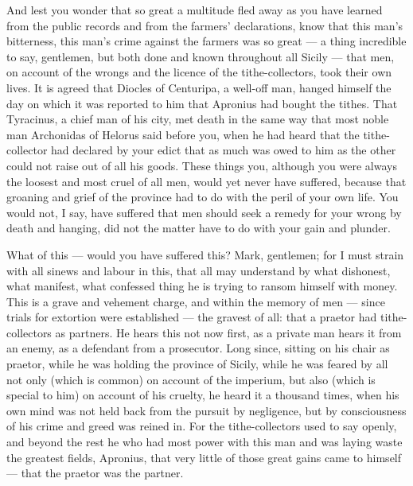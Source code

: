  And lest you wonder that so great a multitude fled away as you have learned from the public records and from the farmers' declarations, know that this man's bitterness, this man's crime against the farmers was so great --- a thing incredible to say, gentlemen, but both done and known throughout all Sicily --- that men, on account of the wrongs and the licence of the tithe-collectors, took their own lives. It is agreed that Diocles of Centuripa, a well-off man, hanged himself the day on which it was reported to him that Apronius had bought the tithes. That Tyracinus, a chief man of his city, met death in the same way that most noble man Archonidas of Helorus said before you, when he had heard that the tithe-collector had declared by your edict that as much was owed to him as the other could not raise out of all his goods. These things you, although you were always the loosest and most cruel of all men, would yet never have suffered, because that groaning and grief of the province had to do with the peril of your own life. You would not, I say, have suffered that men should seek a remedy for your wrong by death and hanging, did not the matter have to do with your gain and plunder.

 What of this --- would you have suffered this? Mark, gentlemen; for I must strain with all sinews and labour in this, that all may understand by what dishonest, what manifest, what confessed thing he is trying to ransom himself with money. This is a grave and vehement charge, and within the memory of men --- since trials for extortion were established --- the gravest of all: that a praetor had tithe-collectors as partners. He hears this not now first, as a private man hears it from an enemy, as a defendant from a prosecutor. Long since, sitting on his chair as praetor, while he was holding the province of Sicily, while he was feared by all not only (which is common) on account of the imperium, but also (which is special to him) on account of his cruelty, he heard it a thousand times, when his own mind was not held back from the pursuit by negligence, but by consciousness of his crime and greed was reined in. For the tithe-collectors used to say openly, and beyond the rest he who had most power with this man and was laying waste the greatest fields, Apronius, that very little of those great gains came to himself --- that the praetor was the partner.

